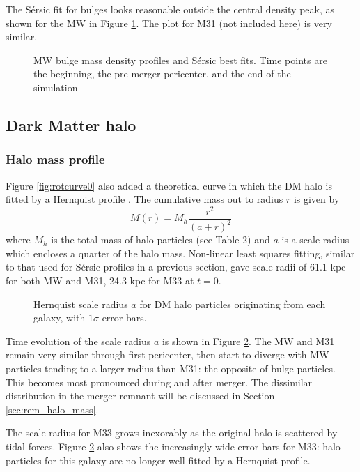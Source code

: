 \documentclass[twocolumn]{aastex63}
\begin{document}
The Sérsic fit for bulges looks reasonable outside the central density peak, as shown for the MW in Figure \ref{fig:MW_bulge_sersic}. The plot for M31 (not included here) is very  similar.

\begin{figure}[bht!]
	\caption{MW bulge mass density profiles and Sérsic best fits. Time points are the beginning, the pre-merger pericenter, and the end of the simulation
		\label{fig:MW_bulge_sersic}}
\end{figure}

\subsection{Dark Matter halo}

\subsubsection{Halo mass profile}

Figure \ref{fig:rotcurve0} also added a theoretical curve in which the DM halo is fitted by a Hernquist profile \citep{hernquist_analytical_1990}. The cumulative mass out to radius $r$ is given by
\[ M(r) = M_h \frac{r^2}{(a+r)^2} \]
where $M_h$ is the total mass of halo particles (see Table 2) and $a$ is a scale radius which encloses a quarter of the halo mass. Non-linear least squares fitting, similar to that used for Sérsic profiles in a previous section, gave scale radii of 61.1 kpc for both MW and M31, 24.3 kpc for M33 at $t=0$.

\begin{figure}[htb!]
	\caption{Hernquist scale radius $a$ for DM halo particles originating from each galaxy, with $1\sigma$ error bars.
		\label{fig:hernquist_a}}
\end{figure}

Time evolution of the scale radius $a$ is shown in Figure \ref{fig:hernquist_a}. The MW and M31 remain very similar through first pericenter, then start to diverge with MW particles tending to a larger radius than M31: the opposite of bulge particles. This becomes most pronounced during and after merger. The dissimilar distribution in the merger remnant will be discussed in Section \ref{sec:rem_halo_mass}.  

The scale radius for M33 grows inexorably as the original halo is scattered by tidal forces. Figure \ref{fig:hernquist_a} also shows the increasingly wide error bars for M33: halo particles for this galaxy are no longer well fitted by a Hernquist profile.
\end{document}
